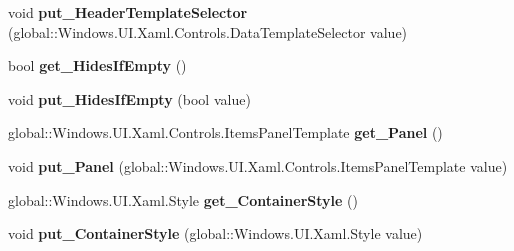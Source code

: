 \begin{DoxyCompactItemize}
\item 
\mbox{\label{interface_windows_1_1_u_i_1_1_xaml_1_1_controls_1_1_i_group_style_a7afe7db38684a1546bd50fa72f58ec53}} 
void {\bfseries put\+\_\+\+Header\+Template\+Selector} (global\+::\+Windows.\+U\+I.\+Xaml.\+Controls.\+Data\+Template\+Selector value)
\item 
\mbox{\label{interface_windows_1_1_u_i_1_1_xaml_1_1_controls_1_1_i_group_style_a9bc855cd77a4f2a8ba5d4c3e7c7174a9}} 
bool {\bfseries get\+\_\+\+Hides\+If\+Empty} ()
\item 
\mbox{\label{interface_windows_1_1_u_i_1_1_xaml_1_1_controls_1_1_i_group_style_aa1cde0010b3374a26237b4f39bcf3370}} 
void {\bfseries put\+\_\+\+Hides\+If\+Empty} (bool value)
\item 
\mbox{\label{interface_windows_1_1_u_i_1_1_xaml_1_1_controls_1_1_i_group_style_a0c9c3cde89c2eb82c05931ac6a601a16}} 
global\+::\+Windows.\+U\+I.\+Xaml.\+Controls.\+Items\+Panel\+Template {\bfseries get\+\_\+\+Panel} ()
\item 
\mbox{\label{interface_windows_1_1_u_i_1_1_xaml_1_1_controls_1_1_i_group_style_a54431a2fb424c8ee66764a90f1eb3a72}} 
void {\bfseries put\+\_\+\+Panel} (global\+::\+Windows.\+U\+I.\+Xaml.\+Controls.\+Items\+Panel\+Template value)
\item 
\mbox{\label{interface_windows_1_1_u_i_1_1_xaml_1_1_controls_1_1_i_group_style_af3ec155955e17dff84857535074042f7}} 
global\+::\+Windows.\+U\+I.\+Xaml.\+Style {\bfseries get\+\_\+\+Container\+Style} ()
\item 
\mbox{\label{interface_windows_1_1_u_i_1_1_xaml_1_1_controls_1_1_i_group_style_af0d3f03b233d17bef1f3a1cf829ca1b7}} 
void {\bfseries put\+\_\+\+Container\+Style} (global\+::\+Windows.\+U\+I.\+Xaml.\+Style value)
\item 

\end{DoxyCompactItemize}
